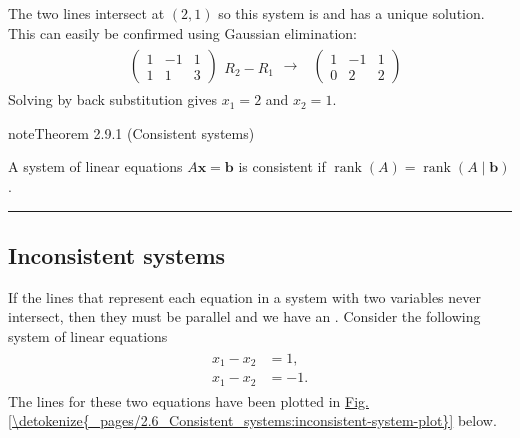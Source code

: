 \documentclass[letterpaper,10pt,english]{jupyterBook}
\begin{document}
\sphinxAtStartPar
The two lines intersect at \((2,1)\) so this system is  and has a unique solution. This can easily be confirmed using Gaussian elimination:
\begin{equation*}
\begin{split} \begin{align*}
    & \left( \begin{array}{cc|c}
        1 & -1 & 1 \\
        1 & 1 & 3
    \end{array} \right)
    \begin{array}{l} \\ R_2 - R_1 \end{array}
    \longrightarrow  &
    \left( \begin{array}{cc|c}
        1 & -1 & 1 \\
        0 & 2 & 2
    \end{array} \right)
\end{align*} \end{split}
\end{equation*}
\sphinxAtStartPar
Solving by back substitution gives \(x_1 = 2\) and \(x_2 = 1.\)
\label{_pages/2.6_Consistent_systems:consistent-system-theorem}
\begin{sphinxadmonition}{note}{Theorem 2.9.1 (Consistent systems)}



\sphinxAtStartPar
A system of linear equations \(A\mathbf{x} = \mathbf{b}\) is consistent if \(\operatorname{rank}(A) = \operatorname{rank}(A \mid \mathbf{b})\).
\end{sphinxadmonition}


\bigskip\hrule\bigskip


\ignorespaces 

\subsection{Inconsistent systems}
\label{\detokenize{_pages/2.6_Consistent_systems:inconsistent-systems}}\label{\detokenize{_pages/2.6_Consistent_systems:index-4}}
\sphinxAtStartPar
If the lines that represent each equation in a system with two variables never intersect, then they must be parallel \sphinxhyphen{} and we have an . Consider the following system of linear equations
\begin{equation*}
\begin{split} \begin{align*}
    x_1 - x_2 &= 1, \\
    x_1 - x_2 & = -1.
\end{align*} \end{split}
\end{equation*}
\sphinxAtStartPar
The lines for these two equations have been plotted in \hyperref[\detokenize{_pages/2.6_Consistent_systems:inconsistent-system-plot}]{Fig.\@ \ref{\detokenize{_pages/2.6_Consistent_systems:inconsistent-system-plot}}} below.
\end{document}
